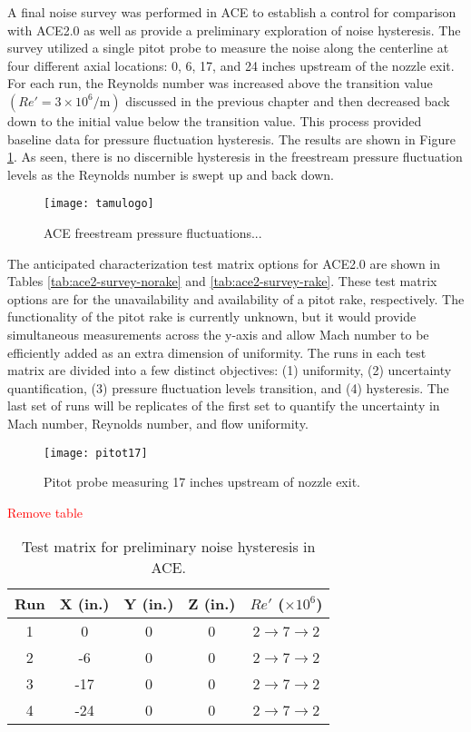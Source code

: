 A final noise survey was performed in ACE to establish a control for comparison with ACE2.0 as well as provide a preliminary exploration of noise hysteresis. The survey utilized a single pitot probe to measure the noise along the centerline at four different axial locations: 0, 6, 17, and 24 inches upstream of the nozzle exit. For each run, the Reynolds number was increased above the transition value $\left(Re' = 3 \times 10^6/\mathrm{m}\right)$ discussed in the previous chapter and then decreased back down to the initial value below the transition value. This process provided baseline data for pressure fluctuation hysteresis. The results are shown in Figure \ref{fig:ace-survey}. As seen, there is no discernible hysteresis in the freestream pressure fluctuation levels as the Reynolds number is swept up and back down. 

\begin{figure}[ht!]
    \centering
    \texttt{[image: tamulogo]}
    \caption{ACE freestream pressure fluctuations...}
    \label{fig:ace-survey}
\end{figure}

The anticipated characterization test matrix options for ACE2.0 are shown in Tables \ref{tab:ace2-survey-norake} and \ref{tab:ace2-survey-rake}. These test matrix options are for the unavailability and availability of a pitot rake, respectively. The functionality of the pitot rake is currently unknown, but it would provide simultaneous measurements across the y-axis and allow Mach number to be efficiently added as an extra dimension of uniformity. The runs in each test matrix are divided into a few distinct objectives: (1) uniformity, (2) uncertainty quantification, (3) pressure fluctuation levels transition, and (4) hysteresis. The last set of runs will be replicates of the first set to quantify the uncertainty in Mach number, Reynolds number, and flow uniformity.

\begin{figure}[ht!]
    \centering
    \texttt{[image: pitot17]}
    \caption{Pitot probe measuring 17 inches upstream of nozzle exit.}
    \label{fig:pitot17}
\end{figure}

\textcolor{red}{Remove table}
\begin{table}[ht!]
    \centering
    \begin{tabular}{|c|c|c|c|c|}
        \hline
    \textbf{Run} & \textbf{X (in.)} & \textbf{Y (in.)} & \textbf{Z (in.)} & \textbf{$Re'$ ($\times10^6$)} \\ \hline
        1 & 0 & 0 & 0 & 2$\to$7$\to$2 \\ \hline
        2 & -6 & 0 & 0 & 2$\to$7$\to$2 \\ \hline
        3 & -17 & 0 & 0 & 2$\to$7$\to$2 \\ \hline
        4 & -24 & 0 & 0 & 2$\to$7$\to$2 \\ \hline
    \end{tabular}
    \caption{Test matrix for preliminary noise hysteresis in ACE.}
    \label{tab:ace-survey}
\end{table}

